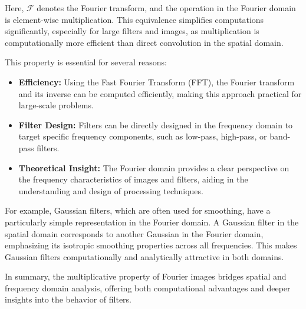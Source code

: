 \documentclass[11pt]{book}
\begin{document}
Here, $\mathcal{F}$ denotes the Fourier transform, and the operation in the Fourier domain is element-wise multiplication. This equivalence simplifies computations significantly, especially for large filters and images, as multiplication is computationally more efficient than direct convolution in the spatial domain.

This property is essential for several reasons:
\begin{itemize}
    \item \textbf{Efficiency:} Using the Fast Fourier Transform (FFT), the Fourier transform and its inverse can be computed efficiently, making this approach practical for large-scale problems.
    \item \textbf{Filter Design:} Filters can be directly designed in the frequency domain to target specific frequency components, such as low-pass, high-pass, or band-pass filters.
    \item \textbf{Theoretical Insight:} The Fourier domain provides a clear perspective on the frequency characteristics of images and filters, aiding in the understanding and design of processing techniques.
\end{itemize}

For example, Gaussian filters, which are often used for smoothing, have a particularly simple representation in the Fourier domain. A Gaussian filter in the spatial domain corresponds to another Gaussian in the Fourier domain, emphasizing its isotropic smoothing properties across all frequencies. This makes Gaussian filters computationally and analytically attractive in both domains.

In summary, the multiplicative property of Fourier images bridges spatial and frequency domain analysis, offering both computational advantages and deeper insights into the behavior of filters.



\backmatter
\end{document}
